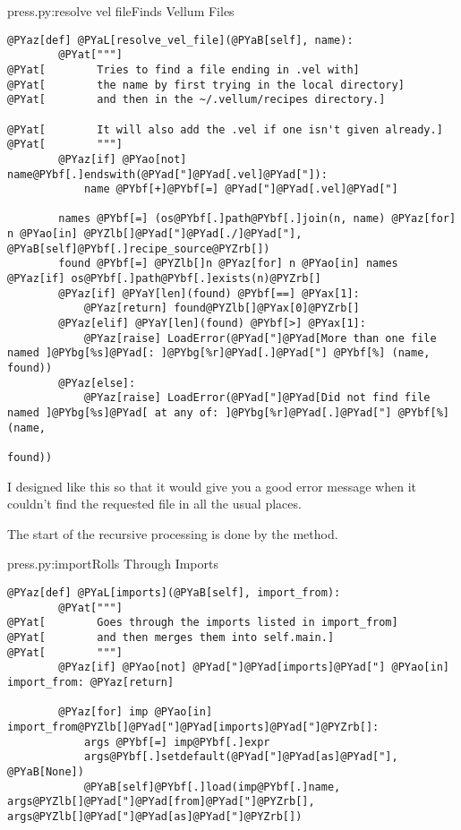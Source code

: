 \begin{code}{press.py:resolve vel file}{Finds Vellum Files}
\begin{Verbatim}[commandchars=@\[\]]
    @PYaz[def] @PYaL[resolve_vel_file](@PYaB[self], name):
        @PYat["""]
@PYat[        Tries to find a file ending in .vel with]
@PYat[        the name by first trying in the local directory]
@PYat[        and then in the ~/.vellum/recipes directory.]

@PYat[        It will also add the .vel if one isn't given already.]
@PYat[        """]
        @PYaz[if] @PYao[not] name@PYbf[.]endswith(@PYad["]@PYad[.vel]@PYad["]): 
            name @PYbf[+]@PYbf[=] @PYad["]@PYad[.vel]@PYad["]

        names @PYbf[=] (os@PYbf[.]path@PYbf[.]join(n, name) @PYaz[for] n @PYao[in] @PYZlb[]@PYad["]@PYad[./]@PYad["], @PYaB[self]@PYbf[.]recipe_source@PYZrb[])
        found @PYbf[=] @PYZlb[]n @PYaz[for] n @PYao[in] names @PYaz[if] os@PYbf[.]path@PYbf[.]exists(n)@PYZrb[]
        @PYaz[if] @PYaY[len](found) @PYbf[==] @PYax[1]:
            @PYaz[return] found@PYZlb[]@PYax[0]@PYZrb[]
        @PYaz[elif] @PYaY[len](found) @PYbf[>] @PYax[1]:
            @PYaz[raise] LoadError(@PYad["]@PYad[More than one file named ]@PYbg[%s]@PYad[: ]@PYbg[%r]@PYad[.]@PYad["] @PYbf[%] (name, found))
        @PYaz[else]:
            @PYaz[raise] LoadError(@PYad["]@PYad[Did not find file named ]@PYbg[%s]@PYad[ at any of: ]@PYbg[%r]@PYad[.]@PYad["] @PYbf[%] (name,
                                                                           found))
\end{Verbatim}

\end{code}

I designed  like this so that it would give you a good
error message when it couldn't find the requested file in all the usual places.

The start of the recursive processing is done by the  method.

\begin{code}{press.py:import}{Rolls Through Imports}
\begin{Verbatim}[commandchars=@\[\]]
    @PYaz[def] @PYaL[imports](@PYaB[self], import_from):
        @PYat["""]
@PYat[        Goes through the imports listed in import_from]
@PYat[        and then merges them into self.main.]
@PYat[        """]
        @PYaz[if] @PYao[not] @PYad["]@PYad[imports]@PYad["] @PYao[in] import_from: @PYaz[return]

        @PYaz[for] imp @PYao[in] import_from@PYZlb[]@PYad["]@PYad[imports]@PYad["]@PYZrb[]:
            args @PYbf[=] imp@PYbf[.]expr
            args@PYbf[.]setdefault(@PYad["]@PYad[as]@PYad["], @PYaB[None])
            @PYaB[self]@PYbf[.]load(imp@PYbf[.]name, args@PYZlb[]@PYad["]@PYad[from]@PYad["]@PYZrb[], args@PYZlb[]@PYad["]@PYad[as]@PYad["]@PYZrb[])
\end{Verbatim}

\end{code}

